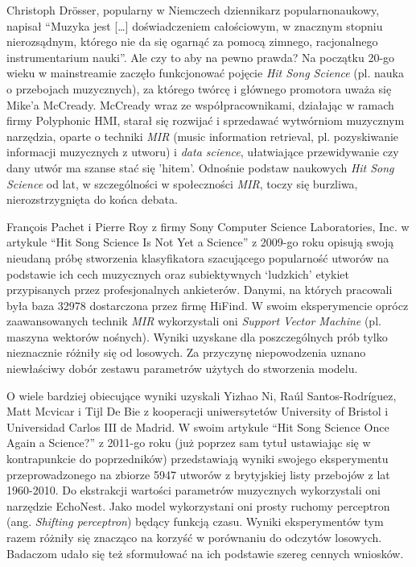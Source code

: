 \documentclass[a4paper,11pt]{article}
\begin{document}
    \bigskip

    Christoph Dr{\"o}sser, popularny w Niemczech dziennikarz popularnonaukowy, napisał ``Muzyka jest [\ldots] doświadczeniem całościowym, w znacznym stopniu nierozsądnym, którego nie da się ogarnąć za pomocą zimnego, racjonalnego instrumentarium nauki''\cite{MuzykaDajSieUwiesc2021}. Ale czy to aby na pewno prawda? Na początku 20-go wieku w mainstreamie zaczęło funkcjonować pojęcie \textit{Hit Song Science} (pl. nauka o przebojach muzycznych), za którego twórcę i głównego promotora uważa się Mike'a McCready\cite{HitSongScienceWiki}. McCready wraz ze współpracownikami, działając w ramach firmy Polyphonic HMI, starał się rozwijać i sprzedawać wytwórniom muzycznym narzędzia, oparte o techniki \textit{MIR} (music information retrieval, pl. pozyskiwanie informacji muzycznych z utworu) i \textit{data science}, ułatwiające przewidywanie czy dany utwór ma szanse stać się 'hitem'\cite{PolyphonicHMIWiki}. Odnośnie podstaw naukowych \textit{Hit Song Science} od lat, w szczególności w społeczności \textit{MIR}, toczy się burzliwa, nierozstrzygnięta do końca debata\cite{HitSongScienceWiki}.

    \bigskip

    François Pachet i Pierre Roy z firmy Sony Computer Science Laboratories, Inc. w artykule ``Hit Song Science Is Not Yet a Science'' z 2009-go roku\cite{HitSongScienceNotYet2009} opisują swoją nieudaną próbę stworzenia klasyfikatora szacującego popularność utworów na podstawie ich cech muzycznych oraz subiektywnych `ludzkich' etykiet przypisanych przez profesjonalnych ankieterów. Danymi, na których pracowali była baza 32978 dostarczona przez firmę HiFind. W swoim eksperymencie oprócz zaawansowanych technik \textit{MIR} wykorzystali oni \textit{Support Vector Machine} (pl. maszyna wektorów nośnych). Wyniki uzyskane dla poszczególnych prób tylko nieznacznie różniły się od losowych. Za przyczynę niepowodzenia uznano niewłaściwy dobór zestawu parametrów użytych do stworzenia modelu.

    \bigskip

    O wiele bardziej obiecujące wyniki uzyskali Yizhao Ni, Raúl Santos-Rodríguez, Matt Mcvicar i Tijl De Bie z kooperacji uniwersytetów University of Bristol i Universidad Carlos III de Madrid. W swoim artykule ``Hit Song Science Once Again a Science?'' z 2011-go roku\cite{HitSongScienceOnceAgain2011} (już poprzez sam tytuł ustawiając się w kontrapunkcie do poprzedników) przedstawiają wyniki swojego eksperymentu przeprowadzonego na zbiorze 5947 utworów z brytyjskiej listy przebojów z lat 1960-2010. Do ekstrakcji wartości parametrów muzycznych wykorzystali oni narzędzie EchoNest. Jako model wykorzystani oni prosty ruchomy perceptron (ang. \textit{Shifting perceptron}) będący funkcją czasu. Wyniki eksperymentów tym razem różniły się znacząco na korzyść w porównaniu do odczytów losowych. Badaczom udało się też sformułować na ich podstawie szereg cennych wniosków.
\end{document}
